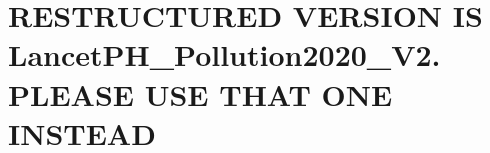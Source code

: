 \documentclass[preprint,12pt]{elsarticle}
\renewenvironment{abstract}{\global\setbox\absbox=\vbox\bgroup
  \hsize=\textwidth\def\baselinestretch{1}%
  \noindent\unskip\textbf{\large Summary}
  \par\medskip\noindent\unskip\ignorespaces}{\egroup}
\begin{document}
\begin{frontmatter}









\end{frontmatter}



%
%
%


\section*{RESTRUCTURED VERSION IS LancetPH\_Pollution2020\_V2. PLEASE USE THAT ONE INSTEAD}
\end{document}
